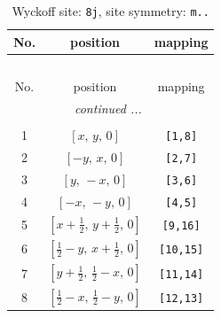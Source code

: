 \documentclass[fleqn,8pt]{jsarticle}
\begin{document}
\begin{longtable}{ccc}
\caption{Wyckoff site: {\tt 8j}, site symmetry: {\tt m..}}
 \\
 \hline \hline
No. & position & mapping \\ \hline \endfirsthead

\multicolumn{2}{l}{\tablename\ \thetable{}} \\
 \hline \hline
No. & position & mapping \\ \hline \endhead

 \hline \hline
\multicolumn{2}{r}{\footnotesize\it continued ...} \\ \endfoot

 \hline \hline
\multicolumn{2}{r}{} \\ \endlastfoot

1 & $\left[ x,\, y,\, 0 \right]$ & {\tt [1,8]} \\ \hline
2 & $\left[ - y,\, x,\, 0 \right]$ & {\tt [2,7]} \\ \hline
3 & $\left[ y,\, - x,\, 0 \right]$ & {\tt [3,6]} \\ \hline
4 & $\left[ - x,\, - y,\, 0 \right]$ & {\tt [4,5]} \\ \hline
5 & $\left[ x + \frac{1}{2},\, y + \frac{1}{2},\, 0 \right]$ & {\tt [9,16]} \\ \hline
6 & $\left[ \frac{1}{2} - y,\, x + \frac{1}{2},\, 0 \right]$ & {\tt [10,15]} \\ \hline
7 & $\left[ y + \frac{1}{2},\, \frac{1}{2} - x,\, 0 \right]$ & {\tt [11,14]} \\ \hline
8 & $\left[ \frac{1}{2} - x,\, \frac{1}{2} - y,\, 0 \right]$ & {\tt [12,13]} \\
\end{longtable}
\renewcommand{\arraystretch}{1.2}
\end{document}
